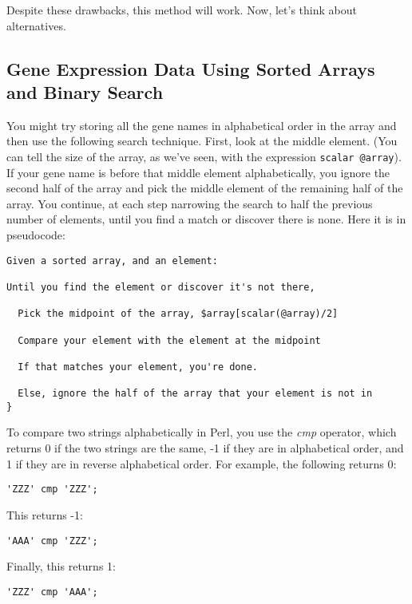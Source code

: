 Despite these drawbacks, this method will work. Now, let's think about alternatives. 

\subsection{Gene Expression Data Using Sorted Arrays and Binary Search}
You might try storing all the gene names in alphabetical order in the array and then use the following search technique. First, look at the middle element. (You can tell the size of the array, as we've seen, with the expression \verb|scalar @array|). If your gene name is before that middle element alphabetically, you ignore the second half of the array and pick the middle element of the remaining half of the array. You continue, at each step narrowing the search to half the previous number of elements, until you find a match or discover there is none. Here it is in pseudocode: 

\begin{lstlisting}
Given a sorted array, and an element:

Until you find the element or discover it's not there,

  Pick the midpoint of the array, $array[scalar(@array)/2]

  Compare your element with the element at the midpoint

  If that matches your element, you're done.

  Else, ignore the half of the array that your element is not in
}
\end{lstlisting}

To compare two strings alphabetically in Perl, you use the \textit{cmp} operator, which returns 0 if the two strings are the same, -1 if they are in alphabetical order, and 1 if they are in reverse alphabetical order. For example, the following returns 0:

\begin{lstlisting}
'ZZZ' cmp 'ZZZ';
\end{lstlisting}

This returns -1:

\begin{lstlisting}
'AAA' cmp 'ZZZ';
\end{lstlisting}

Finally, this returns 1:

\begin{lstlisting}
'ZZZ' cmp 'AAA';
\end{lstlisting}

